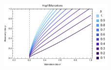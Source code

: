 \documentclass[12pt,english]{article}
\begin{document}
\begin{spacing}{1.9}
 \begin{figure}[h]
 	\centering
 	\includegraphics[width=0.5\textwidth]{fig_HopfPlotb.pdf}
 	\caption{
 	}
 	\label{Hopfb}
 \end{figure}
%
%
%
%
%




\end{spacing}
\end{document}
